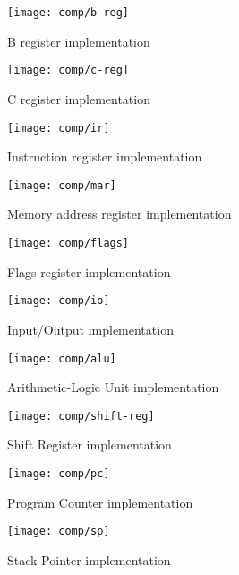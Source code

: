   \begin{figure}[h]
    \centering
    \texttt{[image: comp/b-reg]}
    \caption{B register implementation}
    \label{b-reg-i}
  \end{figure}

  \begin{figure}[h]
    \centering
    \texttt{[image: comp/c-reg]}
    \caption{C register implementation}
    \label{c-reg-i}
  \end{figure}

  \begin{figure}[h]
    \centering
    \texttt{[image: comp/ir]}
    \caption{Instruction register implementation}
    \label{ir-i}
  \end{figure}

  \begin{figure}[h]
    \centering
    \texttt{[image: comp/mar]}
    \caption{Memory address register implementation}
    \label{mar-i}
  \end{figure}

  \begin{figure}[h]
    \centering
    \texttt{[image: comp/flags]}
    \caption{Flags register implementation}
    \label{flags-i}
  \end{figure}

  \begin{figure}[h]
    \centering
    \texttt{[image: comp/io]}
    \caption{Input/Output implementation}
    \label{io-i}
  \end{figure}

  \begin{figure}[h]
    \centering
    \texttt{[image: comp/alu]}
    \caption{Arithmetic-Logic Unit implementation}
    \label{alu-i}
  \end{figure}

  \begin{figure}[h]
    \centering
    \texttt{[image: comp/shift-reg]}
    \caption{Shift Register implementation}
    \label{shift-reg-i}
  \end{figure}

  \begin{figure}[h]
    \centering
    \texttt{[image: comp/pc]}
    \caption{Program Counter implementation}
    \label{pc-i}
  \end{figure}

  \begin{figure}[h]
    \centering
    \texttt{[image: comp/sp]}
    \caption{Stack Pointer implementation}
    \label{sp-i}
  \end{figure}

